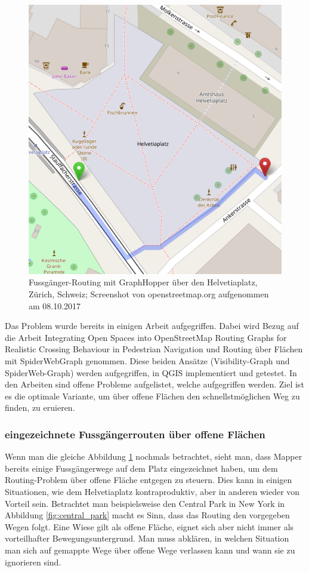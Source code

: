 \begin{figure}[ht]
	\centering
	\includegraphics[width=0.5\linewidth]{technicalreport/img/helvetiaplatz_graphhopper}
	\caption[Fussgänger-Routing]{Fussgänger-Routing mit GraphHopper über den Helvetiaplatz, Zürich, Schweiz; Screenshot von openstreetmap.org aufgenommen am 08.10.2017}
	\label{fig:helvetiaplatz_graphhopper}
\end{figure}

Das Problem wurde bereits in einigen Arbeit aufgegriffen. Dabei wird Bezug auf die Arbeit Integrating Open Spaces into OpenStreetMap Routing Graphs for Realistic Crossing Behaviour in Pedestrian Navigation \cite{graser_visibility_graph} und Routing über Flächen mit SpiderWebGraph \cite{dzafic_spider_web_graph} genommen. Diese beiden Ansätze (Visibility-Graph und SpiderWeb-Graph) werden aufgegriffen, in QGIS implementiert und getestet. In den Arbeiten sind offene Probleme aufgelistet, welche aufgegriffen werden. Ziel ist es die optimale Variante, um über offene Flächen den schnellstmöglichen Weg zu finden, zu eruieren. 


\subsubsection{eingezeichnete Fussgängerrouten über offene Flächen}
\label{subsub:eingezeichnete Fussgängerrouten über offene Flächen}
Wenn man die gleiche Abbildung \ref{fig:helvetiaplatz_graphhopper} nochmals betrachtet, sieht man, dass Mapper bereits einige Fussgängerwege auf dem Platz eingezeichnet haben, um dem Routing-Problem über offene Fläche entgegen zu steuern. Dies kann in einigen Situationen, wie dem Helvetiaplatz kontraproduktiv, aber in anderen wieder von Vorteil sein. Betrachtet man beispielsweise den Central Park in New York in Abbildung \ref{fig:central_park} macht es Sinn, dass das Routing den vorgegeben Wegen folgt. Eine Wiese gilt als offene Fläche, eignet sich aber nicht immer als vorteilhafter Bewegungsuntergrund. Man muss abklären, in welchen Situation man sich auf gemappte Wege über offene Wege verlassen kann und wann sie zu ignorieren sind.

